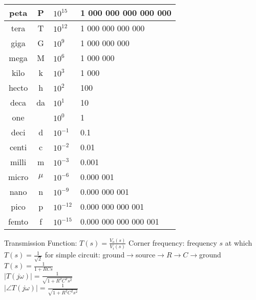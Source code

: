 \documentclass[12pt]{article}
\begin{document}
\begin{spacing}{0.8}
\begin{multicols*}{2}
\begin{flushleft}
\begin{outline}[longenum]
 \\
\begin{tabular}{|c c l l|}                                   \hline
peta  & P     & $10^{ 15}$ & \hfill 1 000 000 000 000 000 \\ \hline
tera  & T     & $10^{ 12}$ & \hfill     1 000 000 000 000 \\ \hline
giga  & G     & $10^{  9}$ & \hfill         1 000 000 000 \\ \hline
mega  & M     & $10^{  6}$ & \hfill             1 000 000 \\ \hline
kilo  & k     & $10^{  3}$ & \hfill                 1 000 \\ \hline
hecto & h     & $10^{  2}$ & \hfill                   100 \\ \hline
deca  & da    & $10^{  1}$ & \hfill                    10 \\ \hline
one   &       & $10^{ 0 }$ & \hfill       1 \hfill \hfill \\ \hline
deci  & d     & $10^{- 1}$ & 0.1                          \\ \hline
centi & c     & $10^{- 2}$ & 0.01                         \\ \hline
milli & m     & $10^{- 3}$ & 0.001                        \\ \hline
micro & $\mu$ & $10^{- 6}$ & 0.000 001                    \\ \hline
nano  & n     & $10^{- 9}$ & 0.000 000 001                \\ \hline
pico  & p     & $10^{-12}$ & 0.000 000 000 001            \\ \hline
femto & f     & $10^{-15}$ & 0.000 000 000 000 001        \\ \hline
\end{tabular}


  \1 Transmission Function: $T(s) = \frac{V_o(s)}{V_i(s)}$
  \1 Corner frequency: frequency $s$ at which $T(s)=\frac{1}{\sqrt{2}}$
  \1 for simple circuit:
    ground$\rightarrow$source$\rightarrow R \rightarrow C\rightarrow$ground
    \2 $T(s)=\frac{1}{1+RCs}$
    \\ $|T(j\omega)|=\frac{1}{\sqrt{1+R^2C^2s^2}}$
    \\ $|\angle T(j\omega)|=\frac{1}{\sqrt{1+R^2C^2s^2}}$


\end{outline}
\end{flushleft}
\end{multicols*}
\end{spacing}
\end{document}
